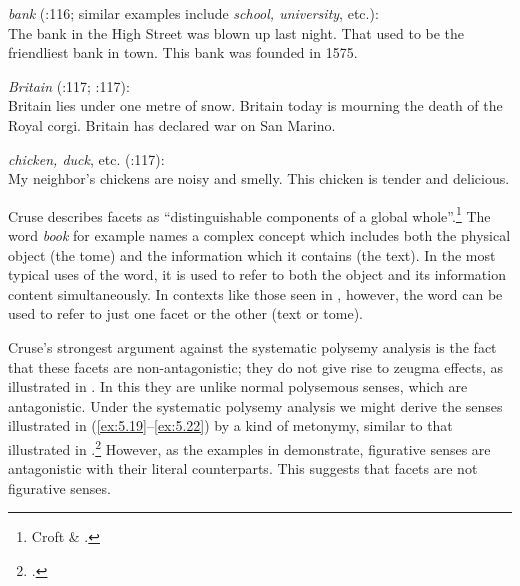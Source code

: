 \ea \label{ex:5.20}
 \textit{bank} (\citealt{Cruse2000}:116; similar examples include \textit{school, university}, etc.):\\
\ea The bank in the High Street was blown up last night.  
\ex That used to be the friendliest bank in town.         
\ex This bank was founded in 1575.                        
                       \z
\z

\ea \label{ex:5.21} \textit{Britain} (\citealt{Cruse2000}:117; \citealt{CroftCruse2004}:117):\\
\ea Britain lies under one metre of snow.                    
\ex Britain today is mourning the death of the Royal corgi.  
\ex Britain has declared war on San Marino.                  
                       \z
\z

\ea \label{ex:5.22}
\textit{chicken, duck}, etc. (\citealt{CroftCruse2004}:117):\\
\ea My neighbor’s chickens are noisy and smelly.  
\ex This chicken is tender and delicious.         
                       \z
\z


Cruse describes facets as “distinguishable components of a global whole”.\footnote{Croft \& \citet[116]{Cruse2004}.} The word \textit{book} for example names a complex concept which includes both the physical object (the tome) and the information which it contains (the text). In the most typical uses of the word, it is used to refer to both the object and its information content simultaneously. In contexts like those seen in , however, the word can be used to refer to just one facet or the other (text or tome).



Cruse’s strongest argument against the systematic polysemy analysis is the fact that these facets are non-antagonistic; they do not give rise to zeugma effects, as illustrated in . In this they are unlike normal polysemous senses, which are antagonistic. Under the systematic polysemy analysis we might derive the senses illustrated in (\ref{ex:5.19}--\ref{ex:5.22}) by a kind of metonymy, similar to that illustrated in .\footnote{\citet{Nunberg1979,Nunberg1995}.} However, as the examples in  demonstrate, figurative senses are antagonistic with their literal counterparts. This suggests that facets are not figurative senses.


